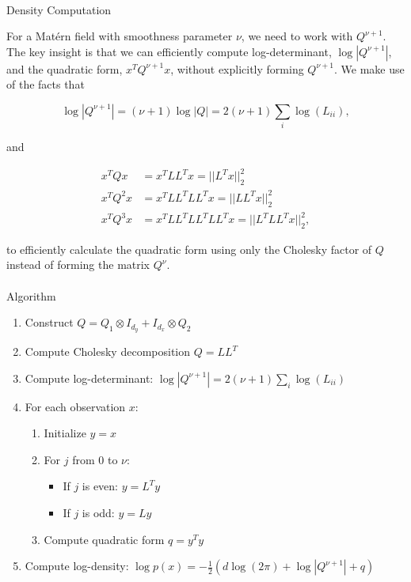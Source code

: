 \documentclass[journal=,manuscript=]{achemso}
\makeatletter
\let\oldparagraph\paragraph
\renewcommand{\paragraph}{
    \@ifstar
      \xxxParagraphStar
      \xxxParagraphNoStar
  }
\newcommand{\xxxParagraphStar}[1]{\oldparagraph*{#1}\mbox{}}
\newcommand{\xxxParagraphNoStar}[1]{\oldparagraph{#1}\mbox{}}
\providecommand{\tightlist}{%
  \setlength{\itemsep}{0pt}\setlength{\parskip}{0pt}}\usepackage{longtable,booktabs,array}
\makeatother
\begin{document}
\paragraph{Density Computation}\label{density-computation}

For a Matérn field with smoothness parameter \(\nu\), we need to work
with \(Q^{\nu+1}\). The key insight is that we can efficiently compute
log-determinant, \(\log|Q^{\nu+1}|\), and the quadratic form,
\(x^T Q^{\nu+1} x\), without explicitly forming \(Q^{\nu+1}\). We make
use of the facts that

\[
\log|Q^{\nu+1}| = (\nu+1)\log|Q| = 2(\nu+1)\sum_{i}\log(L_{ii}),
\]

and

\[
\begin{aligned}
x^T Q x &= x^T L L^T x = ||L^T x||_2^2 \\
x^T Q^2 x &=  x^T L L^T L L^T x = ||LL^T x||_2^2 \\
x^T Q^3 x &=  x^T L L^T L L^T L L^T x = ||L^TLL^T x||_2^2,
\end{aligned}
\]

to efficiently calculate the quadratic form using only the Cholesky
factor of \(Q\) instead of forming the matrix \(Q^\nu\).

\paragraph{Algorithm}\label{algorithm}

\begin{enumerate}
\def\labelenumi{\arabic{enumi}.}
\tightlist
\item
  Construct \(Q = Q_1 \otimes I_{d_y} + I_{d_x} \otimes Q_2\)
\item
  Compute Cholesky decomposition \(Q = LL^T\)
\item
  Compute log-determinant:
  \(\log|Q^{\nu+1}| = 2(\nu+1)\sum_{i}\log(L_{ii})\)
\item
  For each observation \(x\):

  \begin{enumerate}
  \def\labelenumii{\roman{enumii})}
  \tightlist
  \item
    Initialize \(y = x\)
  \item
    For \(j\) from 0 to \(\nu\):

    \begin{itemize}
    \tightlist
    \item
      If \(j\) is even: \(y = L^T y\)
    \item
      If \(j\) is odd: \(y = L y\)
    \end{itemize}
  \item
    Compute quadratic form \(q = y^Ty\)
  \end{enumerate}
\item
  Compute log-density:
  \(\log p(x) = -\frac{1}{2}(d\log(2\pi) + \log|Q^{\nu+1}| + q)\)
\end{enumerate}
\end{document}
